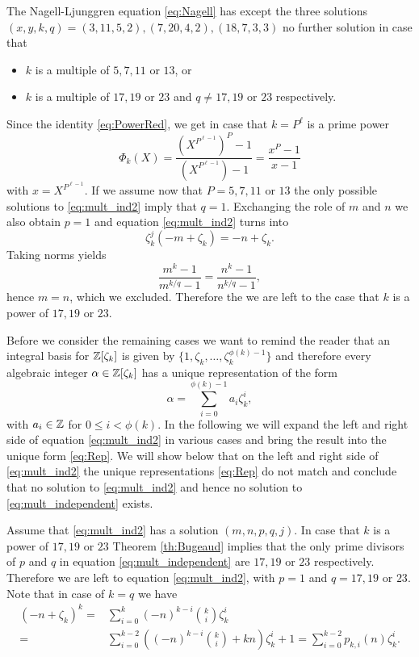 \begin{theorem}\label{th:Bugeaud}
The Nagell-Ljunggren equation \eqref{eq:Nagell} has except the three solutions $(x,y,k,q)=(3,11,5,2),(7,20,4,2),(18,7,3,3)$ no further solution in case that
 \begin{itemize}
  \item $k$ is a multiple of $5,7,11$ or $13$, or
  \item $k$ is a multiple of $17,19$ or $23$ and $q\neq 17,19$ or $23$ respectively.
 \end{itemize}
\end{theorem}

Since the identity \eqref{eq:PowerRed}, we get in case that $k=P^\ell$ is a prime power
\[\Phi_{k}(X)=\frac{\left(X^{P^{\ell-1}}\right)^P -1}{\left(X^{P^{\ell-1}}\right)-1}=\frac{x^P-1}{x-1}\]
with $x=X^{P^{\ell -1}}$. If we assume now that $P=5,7,11$ or $13$ the only possible
solutions to \eqref{eq:mult_ind2} imply that $q=1$. Exchanging the role of
$m$ and $n$ we also obtain $p=1$ and equation \eqref{eq:mult_ind2}
turns into
$$\zeta_k^j(-m+\zeta_k)=-n+\zeta_k.$$
Taking norms yields
$$\frac{m^k-1}{m^{k/q}-1}=\frac{n^k-1}{n^{k/q}-1},$$
hence $m=n$, which we excluded. Therefore the we are left to the case that $k$ is a power of $17,19$ or $23$.

Before we consider the remaining cases we want to remind the reader
that an integral basis for ${\mathbb Z}[\zeta_k]$ is given by
$\{1,\zeta_k,\ldots,\zeta_k^{\phi(k)-1}\}$ and therefore every
algebraic integer $\alpha\in{\mathbb Z}[\zeta_k]$ has a unique representation
of the form
\begin{equation}\label{eq:Rep}
\alpha=\sum_{i=0}^{\phi(k)-1} a_i\zeta_k^i, 
\end{equation}
with $a_i\in{\mathbb Z}$ for $0\leq i<\phi(k)$. In the following we will expand
the left and right side of equation \eqref{eq:mult_ind2} in various
cases and bring the result into the unique form \eqref{eq:Rep}. We will
show below that on the left and right side of \eqref{eq:mult_ind2} the
unique representations \eqref{eq:Rep} do not match and conclude that
no solution to \eqref{eq:mult_ind2} and hence no solution to
\eqref{eq:mult_independent} exists.

Assume that \eqref{eq:mult_ind2} has a solution $(m,n,p,q,j)$. In case that $k$ is a power of $17,19$ or $23$ Theorem \ref{th:Bugeaud} implies that the only 
prime divisors of $p$ and $q$ in equation \eqref{eq:mult_independent} are $17,19$ 
or $23$ respectively. Therefore we are left to equation \eqref{eq:mult_ind2}, with $p=1$ and $q=17,19$ or $23$. Note that in case of $k=q$ we have
\begin{align*}
(-n+\zeta_k)^k=&\sum_{i=0}^{k} (-n)^{k-i}{k \choose i} \zeta_k^{i}\\
=&\sum_{i=0}^{k-2} \left((-n)^{k-i}{k \choose i}+kn\right)\zeta_k^i +1=\sum_{i=0}^{k-2} p_{k,i}(n)\zeta_k^i.
\end{align*}

